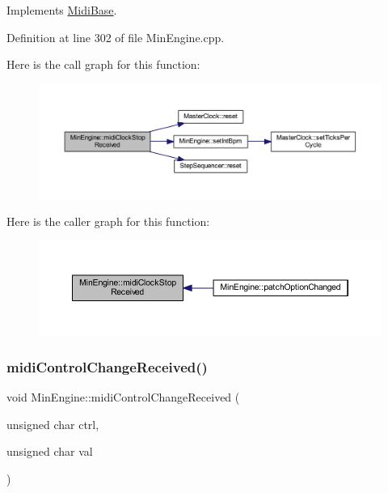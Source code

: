Implements \hyperlink{class_midi_base_ab9a5c65ebffdfc31e118fef9e4dd04bb}{Midi\+Base}.



Definition at line 302 of file Min\+Engine.\+cpp.

Here is the call graph for this function\+:
\nopagebreak
\begin{figure}[H]
\begin{center}
\leavevmode
\includegraphics[width=350pt]{class_min_engine_a08ac0328006e01f44ffbb3c78f4f504a_cgraph}
\end{center}
\end{figure}
Here is the caller graph for this function\+:
\nopagebreak
\begin{figure}[H]
\begin{center}
\leavevmode
\includegraphics[width=350pt]{class_min_engine_a08ac0328006e01f44ffbb3c78f4f504a_icgraph}
\end{center}
\end{figure}
\mbox{\label{class_min_engine_ad7404def0db3926e77c8828cab13cca9}} 
\subsubsection{\texorpdfstring{midi\+Control\+Change\+Received()}{midiControlChangeReceived()}}
{\footnotesize\ttfamily void Min\+Engine\+::midi\+Control\+Change\+Received (\begin{DoxyParamCaption}\item[{unsigned char}]{ctrl,  }\item[{unsigned char}]{val }\end{DoxyParamCaption})\hspace{0.3cm}{\ttfamily [virtual]}}



